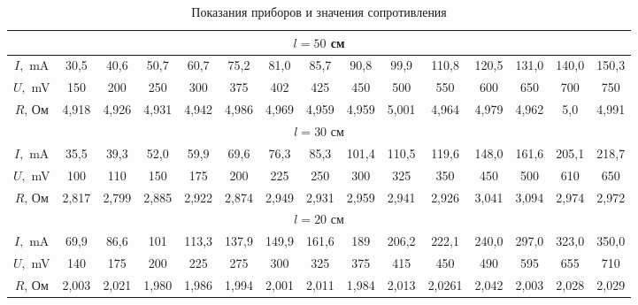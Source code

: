\documentclass[a4paper]{article}
\begin{document}
\vspace{-0.5cm}
\begin{table}[h]
\caption{Показания приборов и значения сопротивления}
\centering
\begin{tabular}{|c|c|c|c|c|c|c|c|c|c|c|c|c|c|c|}
\hline
\multicolumn{15}{|c|}{ $l = 50$ см} \\
\hline
$I,$ mA  & 30,5 & 40,6 & 50,7 & 60,7 & 75,2 & 81,0 & 85,7 & 90,8 & 99,9 & 110,8 & 120,5 & 131,0 & 140,0 & 150,3 \\
\hline
$U,$ mV & 150 & 200 & 250 & 300 & 375 & 402 & 425 & 450 & 500 & 550 & 600 & 650& 700 & 750 \\
\hline
$R$, Ом & 4,918 & 4,926 & 4,931 & 4,942 & 4,986 & 4,969 & 4,959 & 4,959 & 5,001 & 4,964 & 4,979 & 4,962 & 5,0 & 4,991 \\

\hline
\multicolumn{15}{|c|}{ $l = 30$ см} \\
\hline
$I,$ mA & 35,5 & 39,3 & 52,0 & 59,9 & 69,6 & 76,3 & 85,3 & 101,4 & 110,5 & 119,6 & 148,0 & 161,6 & 205,1 & 218,7 \\
\hline
$U,$ mV & 100 & 110 & 150 & 175 & 200 & 225 & 250 & 300 & 325 & 350 & 450 & 500 & 610 & 650 \\
\hline
$R$, Ом & 2,817 & 2,799 & 2,885 & 2,922 & 2,874 & 2,949 & 2,931 & 2,959 & 2,941 & 2,926 & 3,041 & 3,094 & 2,974 & 2,972 \\

\hline
\multicolumn{15}{|c|}{ $l = 20$ см} \\
\hline
$I,$ mA & 69,9 & 86,6 & 101 & 113,3 & 137,9 & 149,9 & 161,6 & 189 & 206,2 & 222,1 & 240,0 & 297,0 & 323,0 & 350,0 \\
\hline
$U,$ mV & 140 & 175 & 200 & 225 & 275 & 300 & 325 & 375 & 415 & 450 & 490 & 595 & 655 & 710 \\
\hline
$R$, Ом & 2,003 & 2,021 & 1,980 & 1,986 & 1,994 & 2,001 & 2,011 & 1,984 & 2,013 & 2,0261 & 2,042 & 2,003 & 2,028 & 2,029 \\

\hline
\end{tabular}
\end{table}
\end{document}
